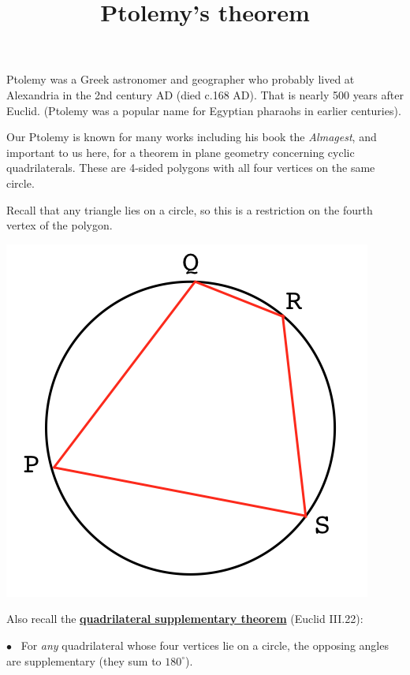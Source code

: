 \documentclass[11pt, oneside]{article}
\title{Ptolemy's theorem}
\date{}
\begin{document}
\maketitle
\Large


Ptolemy was a Greek astronomer and geographer who probably lived at Alexandria in the 2nd century AD (died c.168 AD).  That is nearly 500 years after Euclid.  (Ptolemy was a popular name for Egyptian pharaohs in earlier centuries).

Our Ptolemy is known for many works including his book the \emph{Almagest}, and important to us here, for a theorem in plane geometry concerning cyclic quadrilaterals.  These are 4-sided polygons with all four vertices on the same circle.  

Recall that any triangle lies on a circle, so this is a restriction on the fourth vertex of the polygon.
\begin{center} \includegraphics [scale=0.35] {circles_4.png} \end{center}

Also recall the \hyperref[sec:quadrilateral_supplementary]{\textbf{quadrilateral supplementary theorem}} (Euclid III.22):

$\bullet$ \ For \emph{any} quadrilateral whose four vertices lie on a circle, the opposing angles are supplementary (they sum to $180^\circ$).
\end{document}
